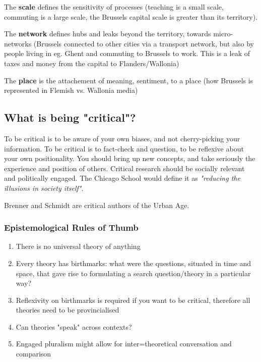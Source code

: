 \documentclass{article}
\begin{document}
The \textbf{scale} defines the sensitivity of processes (teaching is a small scale, commuting is a large scale, the Brussels capital scale is greater than its territory). 

The \textbf{network} defines hubs and leaks beyond the territory, towards micro-networks (Brussels connected to other cities via a transport network, but also by people living in eg. Ghent and commuting to Brussels to work. This is a leak of taxes and money from the capital to Flanders/Wallonia)

The \textbf{place} is the attachement of meaning, sentiment, to a place (how Brussels is represented in Flemish vs. Wallonia media)

\subsection{What is being "critical"?}

To be critical is to be aware of your own biases, and not cherry-picking your information. To be critical is to fact-check and question, to be reflexive about your own positionality. You should bring up new concepts, and take seriously the experience and position of others. Critical research should be socially relevant and politically engaged. The Chicago School would define it as \textit{"reducing the illusions in society itself"}.

Brenner and Schmidt are critical authors of the Urban Age.

\subsubsection{Epistemological Rules of Thumb}

\begin{enumerate}
  \item There is no universal theory of anything
  \item Every theory has birthmarks: what were the questions, situated in time and space, that gave rise to formulating a search question/theory in a particular way?
  \item Reflexivity on birthmarks is required if you want to be critical, therefore all theories need to be provincialised
  \item Can theories "speak" across contexts?
  \item Engaged pluralism might allow for inter=theoretical conversation and comparison
\end{enumerate}
\end{document}
